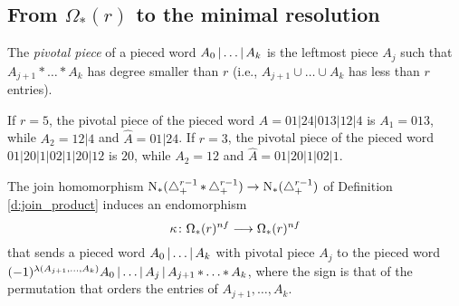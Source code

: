 
\subsection{From \texorpdfstring{$\Omega_*(r)$}{Omega(r)} to the minimal resolution}\label{ss:mapf} The \emph{pivotal piece} of a pieced word $A_0\operatorname{|} \ldots\operatorname{|} A_k$ is the leftmost piece $A_j$ such that $A_{j+1}*\ldots*A_k$ has degree smaller than $r$ (i.e., $A_{j+1}\cup\ldots\cup A_k$ has less than $r$ entries).

\begin{example}
	If $r=5$, the pivotal piece of the pieced word $A=01|24|013|12|4$ is $A_1 = 013$, while $A_2 = 12|4$ and $\hat{A} = 01|24$. If $r=3$, the pivotal piece of the pieced word $01|20|1|02|1|20|12$ is $20$, while $A_2 = 12$ and $\hat{A} = 01|20|1|02|1$.
\end{example}

The join homomorphism $\operatorname{N}_{*}(\triangle_{+}^{r-1}\operatorname{\ast} \triangle_{+}^{r-1})\to \operatorname{N}_{*}(\triangle_{+}^{r-1})$ of Definition \ref{d:join_product} induces an endomorphism
\[
\kappa\colon \Omega_*(r)^{nf}\longrightarrow \Omega_*(r)^{nf}
\]
that sends a pieced word $A_0\operatorname{|} \ldots\operatorname{|} A_k$ with pivotal piece $A_j$ to the pieced word $(-1)^{\lambda(A_{j+1},\ldots,A_k)}A_0\operatorname{|} \ldots\operatorname{|} A_j\operatorname{|} A_{j+1}\operatorname{\ast}\ldots\operatorname{\ast} A_k$, where the sign is that of the permutation that orders the entries of $A_{j+1},\ldots,A_k$.


